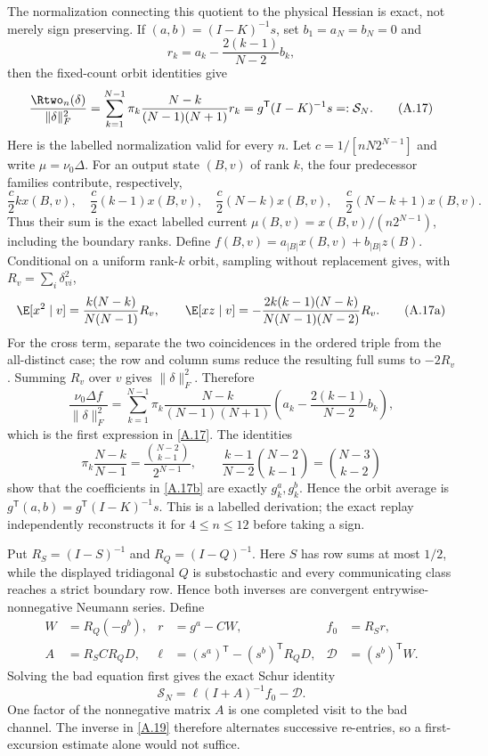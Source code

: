 The normalization connecting this quotient to the physical Hessian is
exact, not merely sign preserving.  If $(a,b)=(I-K)^{-1}s$, set
$b_1=a_N=b_N=0$ and
\[
 r_k=a_k-\frac{2(k-1)}{N-2}b_k,
\]
then the fixed-count orbit identities give
\[
 \frac{\Rtwo_n(\delta)}{\|\delta\|_F^2}
 =\sum_{k=1}^{N-1}\pi_k\frac{N-k}{(N-1)(N+1)}r_k
 =g^{\mathsf T}(I-K)^{-1}s=:\mathcal S_N.                  \tag{A.17}\label{A.17}
\]
Here is the labelled normalization valid for every $n$.  Let
$c=1/[nN2^{N-1}]$ and write $\mu=\nu_0\Delta$.  For an output state $(B,v)$
of rank $k$, the four predecessor families contribute, respectively,
\[
 {\frac{c}{2}}kx(B,v),\quad {\frac{c}{2}}(k-1)x(B,v),\quad
 {\frac{c}{2}}(N-k)x(B,v),\quad {\frac{c}{2}}(N-k+1)x(B,v).
\]
Thus their sum is the exact labelled current
$\mu(B,v)=x(B,v)/(n2^{N-1})$, including the boundary ranks.  Define
$f(B,v)=a_{|B|}x(B,v)+b_{|B|}z(B)$.  Conditional on a uniform rank-$k$
orbit, sampling without replacement gives, with
$R_v=\sum_i\delta_{vi}^2$,
\[
 \E[x^2\mid v]={\frac{k(N-k)}{ N(N-1)}}R_v,\qquad
 \E[xz\mid v]=-{\frac{2k(k-1)(N-k)}{ N(N-1)(N-2)}}R_v.       \tag{A.17a}\label{A.17a}
\]
For the cross term, separate the two coincidences in the ordered triple
from the all-distinct case; the row and column sums reduce the resulting
full sums to $-2R_v$.  Summing $R_v$ over $v$ gives
$\|\delta\|_F^2$.  Therefore
\[
 {\frac{\nu_0\Delta f}{\|\delta\|_F^2}}
 =\sum_{k=1}^{N-1}\pi_k{\frac{N-k}{(N-1)(N+1)}}
 \left(a_k-{\frac{2(k-1)}{ N-2}}b_k\right),                  \tag{A.17b}\label{A.17b}
\]
which is the first expression in \eqref{A.17}.  The identities
\[
 \pi_k{\frac{N-k}{ N-1}}
 ={\frac{\binom{N-2}{k-1}}{2^{N-1}}},\qquad
 {\frac{k-1}{ N-2}}\binom{N-2}{k-1}=\binom{N-3}{k-2}
\]
show that the coefficients in \eqref{A.17b} are exactly $g_k^a,g_k^b$.
Hence the orbit average is
$g^{\mathsf T}(a,b)=g^{\mathsf T}(I-K)^{-1}s$.  This is a labelled
derivation; the exact replay independently reconstructs it for
$4\le n\le12$ before taking a sign.

Put $R_S=(I-S)^{-1}$ and $R_Q=(I-Q)^{-1}$.  Here $S$ has row sums at most
$1/2$, while the displayed tridiagonal $Q$ is substochastic and every
communicating class reaches a strict boundary row.  Hence both inverses are
convergent entrywise-nonnegative Neumann series.  Define
\[
\begin{aligned}
 W&=R_Q(-g^b),& r&=g^a-CW,& f_0&=R_Sr,\\
 A&=R_SCR_QD,& \ell&=(s^a)^{\mathsf T}-(s^b)^{\mathsf T}R_QD,&
 \mathcal D&=(s^b)^{\mathsf T}W.
\end{aligned}                                               \tag{A.18}\label{A.18}
\]
Solving the bad equation first gives the exact Schur identity
\[
 \mathcal S_N=\ell(I+A)^{-1}f_0-\mathcal D.                 \tag{A.19}\label{A.19}
\]
One factor of the nonnegative matrix $A$ is one completed visit to the bad
channel.  The inverse in \eqref{A.19} therefore alternates successive
re-entries, so a first-excursion estimate alone would not suffice.

